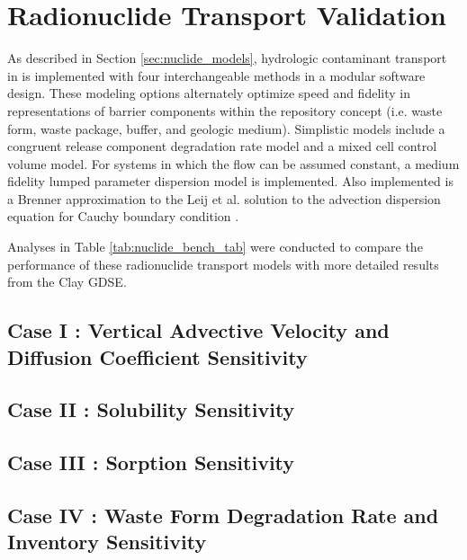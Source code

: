\section{Radionuclide Transport Validation}\label{sec:nuclide_benchmarks}

As described in Section \ref{sec:nuclide_models}, hydrologic contaminant 
transport in \Cyder is implemented with four interchangeable  methods in a 
modular software design. These modeling options alternately optimize speed and 
fidelity in representations of barrier components within the repository concept 
(i.e. waste form, waste package, buffer, and geologic medium)\cite{huff_hydrologic_2013}.  Simplistic models include a congruent 
release component degradation rate model and a mixed cell control volume model. For 
systems in which the flow can be assumed constant, a medium fidelity lumped 
parameter dispersion model is implemented. Also implemented is a Brenner 
approximation to the Leij et al.  solution to the advection dispersion equation 
for Cauchy boundary condition \cite{brenner_diffusion_1962, 
leij_analytical_1991, van_genuchten_analytical_1982}.  

Analyses in Table \ref{tab:nuclide_bench_tab} were conducted to compare the 
performance of these radionuclide transport models with more detailed results from the 
Clay \gls{GDSE}. 




%
\subsection{Case I : Vertical Advective Velocity and Diffusion Coefficient Sensitivity}

\FloatBarrier
\subsection{Case II : Solubility Sensitivity}

\FloatBarrier
\subsection{Case III : Sorption Sensitivity}

\FloatBarrier
\subsection{Case IV : Waste Form Degradation Rate and Inventory Sensitivity}

%
\FloatBarrier
